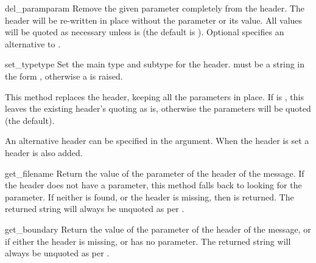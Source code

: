 \begin{methoddesc}[Message]{del_param}{param}
Remove the given parameter completely from the
 header.  The header will be re-written in
place without the parameter or its value.  All values will be quoted
as necessary unless  is  (the default is
).  Optional  specifies an alternative to
.

\end{methoddesc}

\begin{methoddesc}[Message]{set_type}{type}
Set the main type and subtype for the 
header.  must be a string in the form
, otherwise a  is
raised.

This method replaces the  header, keeping all
the parameters in place.  If  is , this
leaves the existing header's quoting as is, otherwise the parameters
will be quoted (the default).

An alternative header can be specified in the  argument.
When the  header is set a
 header is also added.

\end{methoddesc}

\begin{methoddesc}[Message]{get_filename}{}
Return the value of the  parameter of the
 header of the message.  If the header does
not have a  parameter, this method falls back to looking for
the  parameter.  If neither is found, or the header is missing,
then  is returned.  The returned string will always be unquoted
as per .
\end{methoddesc}

\begin{methoddesc}[Message]{get_boundary}{}
Return the value of the  parameter of the
 header of the message, or  if either
the header is missing, or has no  parameter.  The
returned string will always be unquoted as per
.
\end{methoddesc}

